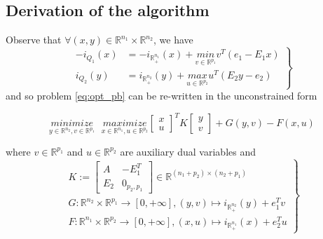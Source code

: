 \documentclass[a4paper,9pt,journal]{IEEEtran}
\begin{document}
\subsection{Derivation of the algorithm}
Observe that $\forall (x, y) \in \mathbb{R}^{n_1} \times \mathbb{R}^{n_2}$, we have
\begin{equation}
  \left .
  \begin{split}
    -i_{Q_1}(x) &= -i_{\mathbb{R}^{n_1}_+}(x) + \underset{v \in \mathbb{R}^{p_1}}{min}\text{}{v^T(e_1 - E_1x)}\\
  i_{Q_2}(y) &= i_{\mathbb{R}^{n_2}_+}(y) + \underset{u \in \mathbb{R}^{p_2}}{max}\text{}{u^T(E_2y - e_2)}
  \end{split}
  \right\}
\end{equation}
and so problem \eqref{eq:opt_pb} can be re-written in the unconstrained form

\begin{equation}
  \underset{y \in \mathbb{R}^{n_2}, v\in \mathbb{R}^{p_1}}{minimize}\text{ }\underset{x \in \mathbb{R}^{n_1}, u \in \mathbb{R}^{p_2}}{maximize}
           {\begin{bmatrix}x\\u\end{bmatrix}^TK\begin{bmatrix}y\\v\end{bmatrix} + G(y, v) - F(x, u)}
  \label{eq:my_opt_pb}
\end{equation}

where $v \in \mathbb{R}^{p_1}$ and $u \in \mathbb{R}^{p_2}$ are auxiliary dual variables and 
\begin{equation}
  \left .
  \begin{split}
    K :=
    \left[
      \begin{array}{c|c}
        A & -E_1^T \\ \hline
        E_2 & 0_{p_2, p_1}
      \end{array}
      \right] \in \mathbb{R}^{(n_1 + p_2) \times (n_2 + p_1)} \\
      G: \mathbb{R}^{n_2} \times \mathbb{R}^{p_1} \rightarrow [0, +\infty], (y, v) \mapsto i_{\mathbb{R}^{n_2}_+}(y) + e_1^Tv\\
      F: \mathbb{R}^{n_1} \times \mathbb{R}^{p_2} \rightarrow [0, +\infty], (x, u) \mapsto i_{\mathbb{R}^{n_1}_+}(x) + e_2^Tu
  \end{split}
  \right\}
\end{equation}
\end{document}
